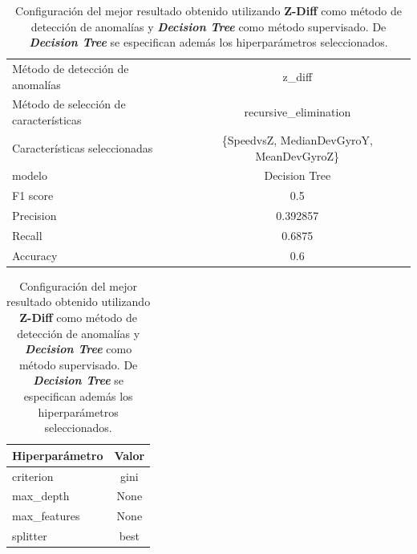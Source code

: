 \begin{appendices}
		\begin{table}[htb]
			\centering
			\caption{Configuración del mejor resultado obtenido utilizando \textbf{Z-Diff} como método de detección de anomalías y \textbf{\emph{Decision Tree}}
			como método supervisado. De \textbf{\emph{Decision Tree}} se especifican además los hiperparámetros seleccionados.}
			\label{table:22}
			\begin{tabular}{lc}
				\toprule
					  Método de detección de anomalías &                                   z\_diff \\
				Método de selección de características &                    recursive\_elimination \\
						 Características seleccionadas & \{SpeedvsZ, MedianDevGyroY, MeanDevGyroZ\}\\
												modelo &                            Decision Tree \\
											  F1 score &                                      0.5 \\
											 Precision &                                 0.392857 \\
												Recall &                                   0.6875 \\
											  Accuracy &                                      0.6 \\
				\bottomrule
				\end{tabular}
			\newline
			\newline

			\begin{tabular}{lc}
				\toprule
				Hiperparámetro & Valor \\
				\midrule
					 criterion &  gini \\
					 max\_depth &  None \\
				  max\_features &  None \\
					  splitter &  best \\
				\bottomrule
			\end{tabular}
			
		\end{table}


\end{appendices}

